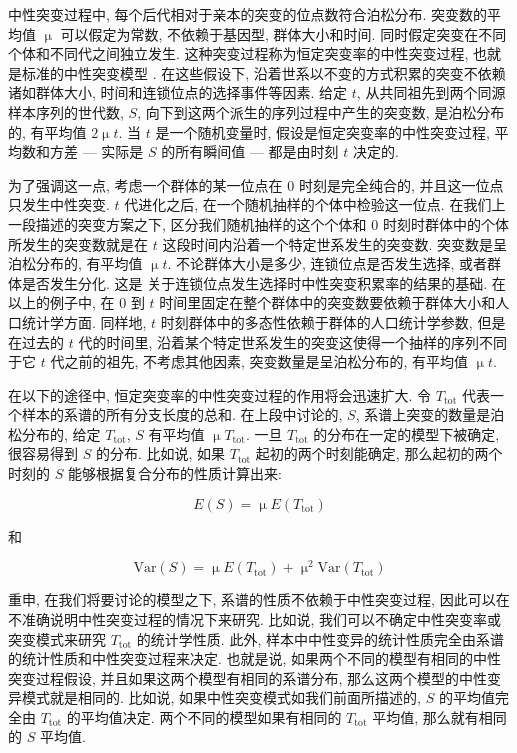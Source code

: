 \documentclass[12pt]{article}
\begin{document}
中性突变过程中, 每个后代相对于亲本的突变的位点数符合泊松分布. 突变数的平均值 $\upmu$ 可以假定为常数,
不依赖于基因型, 群体大小和时间. 同时假定突变在不同个体和不同代之间独立发生.
这种突变过程称为恒定突变率的中性突变过程, 也就是标准的中性突变模型 \parencite{kimura1983,
watterson1975}. 在这些假设下, 沿着世系以不变的方式积累的突变不依赖诸如群体大小,
时间和连锁位点的选择事件等因素. 给定 $t$, 从共同祖先到两个同源样本序列的世代数, $S$,
向下到这两个派生的序列过程中产生的突变数, 是泊松分布的, 有平均值 $2 \upmu t$. 当 $t$
是一个随机变量时, 假设是恒定突变率的中性突变过程, 平均数和方差 --- 实际是 $S$ 的所有瞬间值 ---
都是由时刻 $t$ 决定的.

为了强调这一点, 考虑一个群体的某一位点在 0 时刻是完全纯合的, 并且这一位点只发生中性突变. $t$ 代进化之后,
在一个随机抽样的个体中检验这一位点. 在我们上一段描述的突变方案之下, 区分我们随机抽样的这个个体和 0
时刻时群体中的个体所发生的突变数就是在 $t$ 这段时间内沿着一个特定世系发生的突变数. 突变数是呈泊松分布的,
有平均值 $\upmu t$. 不论群体大小是多少, 连锁位点是否发生选择, 或者群体是否发生分化. 这是
\textcite{birky1988} 关于连锁位点发生选择时中性突变积累率的结果的基础. 在以上的例子中, 在 0 到
$t$ 时间里固定在整个群体中的突变数要依赖于群体大小和人口统计学方面. 同样地, $t$
时刻群体中的多态性依赖于群体的人口统计学参数, 但是在过去的 $t$ 代的时间里,
沿着某个特定世系发生的突变这使得一个抽样的序列不同于它 $t$ 代之前的祖先, 不考虑其他因素,
突变数量是呈泊松分布的, 有平均值 $\upmu t$.

在以下的途径中, 恒定突变率的中性突变过程的作用将会迅速扩大. 令 $T_{\text{tot}}$
代表一个样本的系谱的所有分支长度的总和. 在上段中讨论的, $S$, 系谱上突变的数量是泊松分布的, 给定
$T_{\text{tot}}$, $S$ 有平均值 $\upmu T_{\text{tot}}$. 一旦
$T_{\text{tot}}$ 的分布在一定的模型下被确定, 很容易得到 $S$ 的分布. 比如说, 如果
$T_{\text{tot}}$ 起初的两个时刻能确定, 那么起初的两个时刻的 $S$ 能够根据复合分布的性质计算出来:

\begin{equation} \label{eq:1}
    E(S) = \upmu E(T_{\text{tot}})
\end{equation}

和

\begin{equation} \label{eq:2}
    \text{Var}(S) = \upmu E(T_{\text{tot}}) + \upmu ^{2}\text{Var}(T_{\text{tot}})
\end{equation}

重申, 在我们将要讨论的模型之下, 系谱的性质不依赖于中性突变过程, 因此可以在不准确说明中性突变过程的情况下来研究.
比如说, 我们可以不确定中性突变率或突变模式来研究 $T_{\text{tot}}$ 的统计学性质. 此外,
样本中中性变异的统计性质完全由系谱的统计性质和中性突变过程来决定. 也就是说,
如果两个不同的模型有相同的中性突变过程假设, 并且如果这两个模型有相同的系谱分布,
那么这两个模型的中性变异模式就是相同的. 比如说, 如果中性突变模式如我们前面所描述的, $S$ 的平均值完全由
$T_{\text{tot}}$ 的平均值决定. 两个不同的模型如果有相同的 $T_{\text{tot}}$ 平均值,
那么就有相同的 $S$ 平均值.
\end{document}
